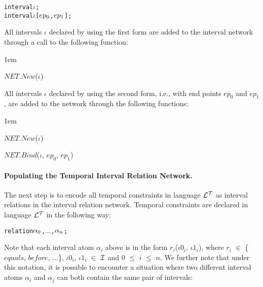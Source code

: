 \documentclass[11pt]{report}
\newenvironment{vverbatim}
{
  \begin{alltt}
}
{
    \vspace{-\baselineskip}
  \end{alltt}
}
\newenvironment{vquote}
{
  \begin{list}{}{\leftmargin 1em}\item[]
}
{
  \end{list}
}
\begin{document}
            \begin{vverbatim}
  interval \(\iota\);
  interval \(\iota\) [\(ep\sb{0}\), \(ep\sb{1}\)];
            \end{vverbatim}

            \noindent
            All intervals $\iota$ declared by using the first form are added
            to the interval network through a call to the following function:

            \begin{vquote}
              $NET.New$($\iota$)
            \end{vquote}

            \noindent
            All intervals $\iota$ declared by using the second form, i.e.,
            with end points $ep_0$ and $ep_1$, are added to the network
            through the following functions:

            \begin{vquote}
              $NET.New$($\iota$)

              $NET.Bind$($\iota$, $ep_0$, $ep_1$)
            \end{vquote}

          \paragraph
            {\bf Populating the Temporal Interval Relation Network.}

            The next step is to encode all temporal constraints in
            language ${\cal L^T}$ as interval relations in the interval
            relation network. Temporal constraints are declared in language
            ${\cal L^T}$ in the following way:

            \begin{vverbatim}
  relation \(\alpha\sb{0}\), \(\ldots\), \(\alpha\sb{n}\);
            \end{vverbatim}

            Note that each interval atom ${\alpha}_i$ above is in the form
            $r_i$(${\iota}0_i$, ${\iota}1_i$), where $r_i$ $\in$ \{$equals$,
            $before$, $\ldots$\}, ${\iota}0_i$, ${\iota}1_i$ $\in$
            ${\cal I}$ and $0$ $\leq$ $i$ $\leq$ $n$. We further note that
            under this notation, it is possible to encounter a situation
            where two different interval atoms ${\alpha}_i$ and ${\alpha}_j$
            can both contain the same pair of intervals:
\end{document}
